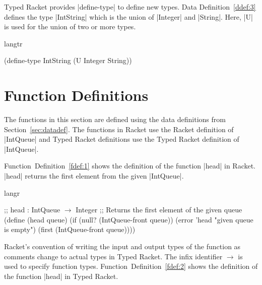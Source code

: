Typed Racket provides \scheme|define-type| to define new types. Data
Definition~\ref{ddef:3} defines the type \scheme|IntString| which is the
union of \scheme|Integer| and \scheme|String|. Here, \scheme|U| is used
for the union of two or more types.

\begin{defexample}
\begin{schemedisplay}
  langtr

  (define-type IntString (U Integer String))

\end{schemedisplay}
\label{ddef:3}
\end{defexample}

\section{Function Definitions}

The functions in this section are defined using the data definitions
from Section~\ref{sec:datadef}. The functions in Racket use the
Racket definition of \scheme|IntQueue| and Typed Racket definitions use
the Typed Racket definition of \scheme|IntQueue|.

Function~Definition~\ref{fdef:1} shows the definition of the function
\scheme|head| in Racket. \scheme|head| returns the first element from
the given \scheme|IntQueue|.
\begin{example}
\begin{schemedisplay}
  langr

  ;; head : IntQueue $\rightarrow$ Integer
  ;; Returns the first element of the given queue
  (define (head queue)
    (if (null? (IntQueue-front queue))
        (error 'head "given queue is empty")
        (first (IntQueue-front queue))))

\end{schemedisplay}
\label{fdef:1}
\end{example}


Racket's convention of writing the input and output types of the
function as comments change to actual types in Typed Racket. The infix
identifier $\rightarrow$ is used to specify function
types. Function~Definition~\ref{fdef:2} shows the definition of the
function \scheme|head| in Typed Racket.

